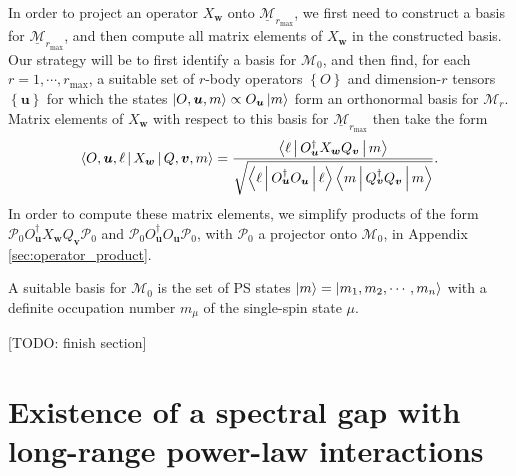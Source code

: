 \documentclass[nofootinbib,notitlepage,11pt]{revtex4-2}
\renewcommand{\t}{\text} %
\newcommand{\f}[2]{\dfrac{#1}{#2}} %
\renewcommand{\set}[1]{\left\{#1\right\}} %
\newcommand{\bk}{\Braket} %
\newcommand{\m}{\bm} %
\newcommand{\1}{\mathds{1}}
\newcommand{\M}{\mathcal{M}}
\renewcommand{\P}{\mathcal{P}}
\newcommand{\ul}{\underline}
\newcommand{\red}[1]{{\color{red} #1}}
\begin{document}
In order to project an operator $X_{\m w}$ onto
$\ul{\M}_{r_{\t{max}}}$, we first need to construct a basis for
$\ul{\M}_{r_{\t{max}}}$, and then compute all matrix elements of
$X_{\m w}$ in the constructed basis.  Our strategy will be to first
identify a basis for $\M_0$, and then find, for each
$r=1,\cdots,r_{\t{max}}$, a suitable set of $r$-body operators
$\set{O}$ and dimension-$r$ tensors $\set{\m u}$ for which the states
$\ket{O,\m u,m}\propto O_{\m u}\ket{m}$ form an orthonormal basis for
$\M_r$.  Matrix elements of $X_{\m w}$ with respect to this basis for
$\ul{\M}_{r_{\t{max}}}$ then take the form
\begin{align}
  \bk{O,\m u,\ell|X_{\m w}|Q,\m v,m}
  = \f{\bk{\ell|O_{\m u}^\dag X_{\m w} Q_{\m v}|m}}
  {\sqrt{\bk{\ell|O_{\m u}^\dag O_{\m u}|\ell}
      \bk{m|Q_{\m v}^\dag Q_{\m v}|m}}}.
\end{align}
In order to compute these matrix elements, we simplify products of the
form $\P_0 O_{\m u}^\dag X_{\m w} Q_{\m v} \P_0$ and
$\P_0 O_{\m u}^\dag O_{\m u} \P_0$, with $\P_0$ a projector onto
$\M_0$, in Appendix \ref{sec:operator_product}.

A suitable basis for $\M_0$ is the set of PS states
$\ket{m}=\ket{m_1,m_2,\cdots,m_n}$ with a definite occupation number
$m_\mu$ of the single-spin state $\mu$.


\red{[TODO: finish section]}



\newpage
\appendix

\section{Existence of a spectral gap with long-range power-law
  interactions}
\label{sec:spectral_gap}
\end{document}
